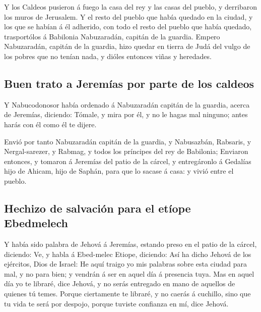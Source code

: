  Y los Caldeos pusieron á fuego la casa del rey y las
casas del pueblo, y derribaron los muros de Jerusalem.  Y
el resto del pueblo que había quedado en la ciudad, y los que se habían
á él adherido, con todo el resto del pueblo que había quedado,
trasportólos á Babilonia Nabuzaradán, capitán de la guardia.
 Empero Nabuzaradán, capitán de la guardia, hizo quedar
en tierra de Judá del vulgo de los pobres que no tenían nada, y dióles
entonces viñas y heredades.

\hypertarget{buen-trato-a-jeremuxedas-por-parte-de-los-caldeos}{%
\subsection{Buen trato a Jeremías por parte de los
caldeos}\label{buen-trato-a-jeremuxedas-por-parte-de-los-caldeos}}

 Y Nabucodonosor había ordenado á Nabuzaradán capitán de
la guardia, acerca de Jeremías, diciendo:  Tómale, y mira
por él, y no le hagas mal ninguno; antes harás con él como él te dijere.

 Envió por tanto Nabuzaradán capitán de la guardia, y
Nabusazbán, Rabsaris, y Nergal-sarezer, y Rabmag, y todos los príncipes
del rey de Babilonia;  Enviaron entonces, y tomaron á
Jeremías del patio de la cárcel, y entregáronlo á Gedalías hijo de
Ahicam, hijo de Saphán, para que lo sacase á casa: y vivió entre el
pueblo.

\hypertarget{hechizo-de-salvaciuxf3n-para-el-etuxedope-ebedmelech}{%
\subsection{Hechizo de salvación para el etíope
Ebedmelech}\label{hechizo-de-salvaciuxf3n-para-el-etuxedope-ebedmelech}}

 Y había sido palabra de Jehová á Jeremías, estando preso
en el patio de la cárcel, diciendo:  Ve, y habla á
Ebed-melec Etiope, diciendo: Así ha dicho Jehová de los ejércitos, Dios
de Israel: He aquí traigo yo mis palabras sobre esta ciudad para mal, y
no para bien; y vendrán á ser en aquel día á presencia tuya.
 Mas en aquel día yo te libraré, dice Jehová, y no serás
entregado en mano de aquellos de quienes tú temes. 
Porque ciertamente te libraré, y no caerás á cuchillo, sino que tu vida
te será por despojo, porque tuviste confianza en mí, dice Jehová.

